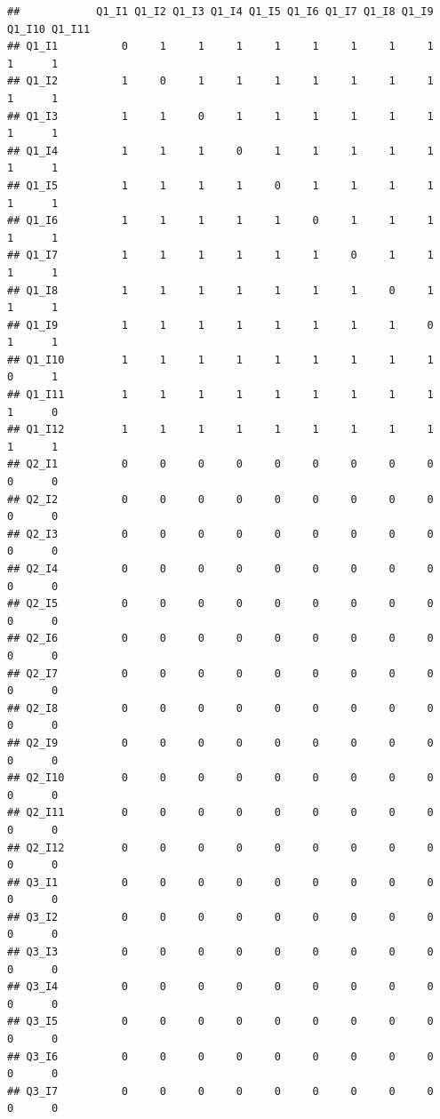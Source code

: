 \documentclass[
]{book}
\begin{document}
\begin{verbatim}
##            Q1_I1 Q1_I2 Q1_I3 Q1_I4 Q1_I5 Q1_I6 Q1_I7 Q1_I8 Q1_I9 Q1_I10 Q1_I11
## Q1_I1          0     1     1     1     1     1     1     1     1      1      1
## Q1_I2          1     0     1     1     1     1     1     1     1      1      1
## Q1_I3          1     1     0     1     1     1     1     1     1      1      1
## Q1_I4          1     1     1     0     1     1     1     1     1      1      1
## Q1_I5          1     1     1     1     0     1     1     1     1      1      1
## Q1_I6          1     1     1     1     1     0     1     1     1      1      1
## Q1_I7          1     1     1     1     1     1     0     1     1      1      1
## Q1_I8          1     1     1     1     1     1     1     0     1      1      1
## Q1_I9          1     1     1     1     1     1     1     1     0      1      1
## Q1_I10         1     1     1     1     1     1     1     1     1      0      1
## Q1_I11         1     1     1     1     1     1     1     1     1      1      0
## Q1_I12         1     1     1     1     1     1     1     1     1      1      1
## Q2_I1          0     0     0     0     0     0     0     0     0      0      0
## Q2_I2          0     0     0     0     0     0     0     0     0      0      0
## Q2_I3          0     0     0     0     0     0     0     0     0      0      0
## Q2_I4          0     0     0     0     0     0     0     0     0      0      0
## Q2_I5          0     0     0     0     0     0     0     0     0      0      0
## Q2_I6          0     0     0     0     0     0     0     0     0      0      0
## Q2_I7          0     0     0     0     0     0     0     0     0      0      0
## Q2_I8          0     0     0     0     0     0     0     0     0      0      0
## Q2_I9          0     0     0     0     0     0     0     0     0      0      0
## Q2_I10         0     0     0     0     0     0     0     0     0      0      0
## Q2_I11         0     0     0     0     0     0     0     0     0      0      0
## Q2_I12         0     0     0     0     0     0     0     0     0      0      0
## Q3_I1          0     0     0     0     0     0     0     0     0      0      0
## Q3_I2          0     0     0     0     0     0     0     0     0      0      0
## Q3_I3          0     0     0     0     0     0     0     0     0      0      0
## Q3_I4          0     0     0     0     0     0     0     0     0      0      0
## Q3_I5          0     0     0     0     0     0     0     0     0      0      0
## Q3_I6          0     0     0     0     0     0     0     0     0      0      0
## Q3_I7          0     0     0     0     0     0     0     0     0      0      0

\end{verbatim}
\end{document}
